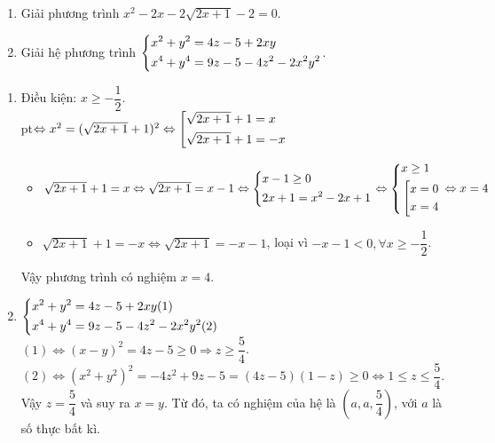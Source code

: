 \begin{ex}%
\hfill
    \begin{enumerate}    
        \item Giải phương trình $x^2-2x-2\sqrt{2x+1}-2=0$.
        \item Giải hệ phương trình $\left\{\begin{aligned}&x^2+y^2=4z-5+2xy\\&x^4+y^4=9z-5-4z^2-2x^2y^2\end{aligned}\right.$.
    \end{enumerate}
\loigiai
    {
    \begin{enumerate}
        \item Điều kiện: $x\ge-\dfrac{1}{2}$.\\
        pt$\Leftrightarrow x^2=(\sqrt{2x+1}+1)^2\Leftrightarrow\left[\begin{aligned}&\sqrt{2x+1}+1=x\\&\sqrt{2x+1}+1=-x\end{aligned}\right.$
        \begin{itemize}
        	\item $\sqrt{2x+1}+1=x\Leftrightarrow\sqrt{2x+1}=x-1\Leftrightarrow\left\{\begin{aligned}&x-1\ge0\\&2x+1=x^2-2x+1\end{aligned}\right.\Leftrightarrow\left\{\begin{aligned}&x\ge1\\&\left[\begin{aligned}&x=0\\&x=4\end{aligned}\right.\end{aligned}\right.\Leftrightarrow x=4$
        	\item $\sqrt{2x+1}+1=-x\Leftrightarrow\sqrt{2x+1}=-x-1$, loại vì $-x-1<0,\forall x\ge-\dfrac{1}{2}$.
        \end{itemize}
    Vậy phương trình có nghiệm $x=4$.
        \item $\left\{\begin{aligned}&x^2+y^2=4z-5+2xy(1)\\&x^4+y^4=9z-5-4z^2-2x^2y^2(2)\end{aligned}\right.$\\
        $(1)\Leftrightarrow(x-y)^2=4z-5\ge0\Rightarrow z\ge\dfrac{5}{4}$.\\
        $(2)\Leftrightarrow(x^2+y^2)^2=-4z^2+9z-5=(4z-5)(1-z)\ge0\Leftrightarrow1\le z\le\dfrac{5}{4}$.\\
        Vậy $z=\dfrac{5}{4}$ và suy ra $x=y$. Từ đó, ta có nghiệm của hệ là $\left(a,a,\dfrac{5}{4}\right)$, với $a$ là số thực bất kì.
    \end{enumerate}
    }
\end{ex}

